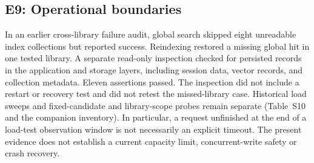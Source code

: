 \subsection{E9: Operational boundaries}
\label{sec:e7}
In an earlier cross-library failure audit, global search skipped eight
unreadable index collections but reported success. Reindexing restored a
missing global hit in one tested library. A separate read-only inspection
checked for persisted records in the application and storage layers,
including session data, vector records, and collection metadata. Eleven
assertions passed. The inspection did not include a restart or recovery test
and did not retest the missed-library case.
Historical load sweeps and fixed-candidate and library-scope probes remain
separate (Table~S10 and the companion inventory). In particular, a request
unfinished at the end of a load-test observation window is not necessarily
an explicit timeout. The present evidence does not establish a current
capacity limit, concurrent-write safety or crash recovery.
